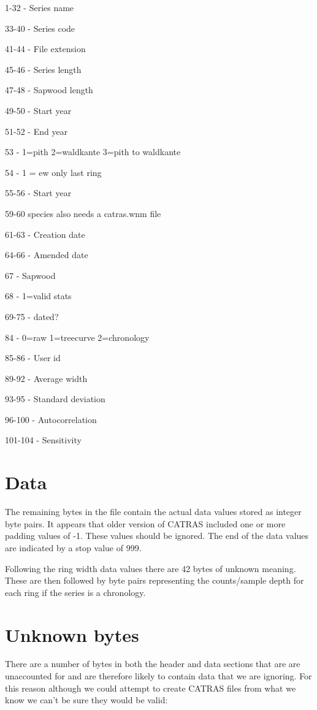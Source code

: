 \documentclass[10pt, headsepline,DIV14,BCOR0.5cm]{scrreprt}
\begin{document}
\begin{itemize*}
 \item 1-32 - Series name
\item  33-40 - Series code
\item  41-44 - File extension
\item  45-46 - Series length
\item  47-48 - Sapwood length
\item  49-50 - Start year
\item  51-52 - End year
\item  53 - 1=pith 2=waldkante 3=pith to waldkante
\item  54 - 1 = ew only last ring
\item  55-56 - Start year
\item  59-60 species also needs a catras.wnm file
\item  61-63 - Creation date
\item  64-66 - Amended date
\item  67 - Sapwood
\item  68 - 1=valid stats
\item  69-75 - dated?
\item  84 - 0=raw 1=treecurve 2=chronology
\item  85-86 - User id
\item  89-92 - Average width
\item  93-95 - Standard deviation
\item  96-100 - Autocorrelation
\item  101-104 - Sensitivity 
\end{itemize*}


\section{Data}

The remaining bytes in the file contain the actual data values stored as integer byte pairs. It appears that older version of CATRAS included one or more padding values of -1. These values should be ignored. The end of the data values are indicated by a stop value of 999.

Following the ring width data values there are 42 bytes of unknown meaning. These are then followed by byte pairs representing the counts/sample depth for each ring if the series is a chronology. 

\section{Unknown bytes}
There are a number of bytes in both the header and data sections that are are unaccounted for and are therefore likely to contain data that we are ignoring. For this reason although we could attempt to create CATRAS files from what we know we can't be sure they would be valid: 
\end{document}

